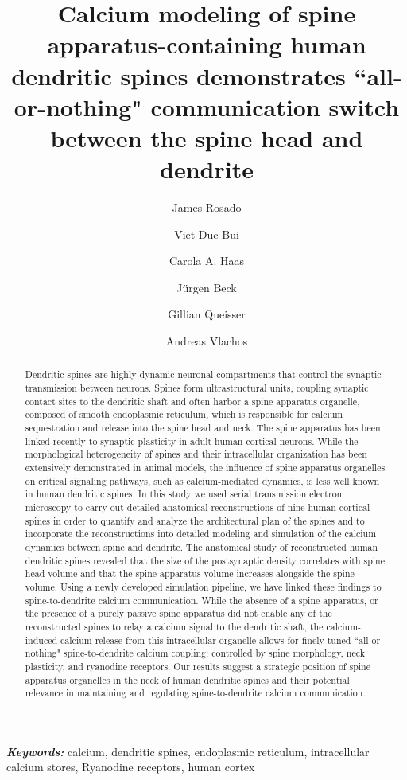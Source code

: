 \documentclass[12pt]{article}
\title{\vspace{-3em}\titlefont Calcium modeling of spine apparatus-containing human dendritic spines demonstrates ``all-or-nothing" communication switch between the spine head and dendrite}
\author[1,$\ast$]{\authorfont James Rosado}
\author[2,$\ast$]{\authorfont Viet Duc Bui}
\author[3,4,5,6]{\authorfont Carola A. Haas}
\author[3,6]{\authorfont J\"urgen Beck}
\author[1,$\$$,\S]{\authorfont Gillian Queisser}
\author[2,4,5,6,$\$$,\S]{\authorfont Andreas Vlachos}
\affil[1]{\authorfont Department of Mathematics, Temple University, Philadelphia, USA}
\affil[2]{\authorfont Department of Neuroanatomy, Institute of Anatomy and Cell Biology, Faculty of Medicine, University of Freiburg, Freiburg, Germany}
\affil[3]{\authorfont Department of Neurosurgery, Medical Center-University of Freiburg, Faculty of Medicine, University of Freiburg, Freiburg, Germany}
\affil[4]{\authorfont Bernstein Center Freiburg, University of Freiburg, Freiburg, Germany}
\affil[5]{\authorfont Center Brain Links Brain Tools, University of Freiburg, Freiburg, Germany}
\affil[6]{\authorfont Center for Basics in NeuroModulation (NeuroModulBasics), Faculty of Medicine, University of Freiburg, Freiburg, Germany}
\affil[$\ast$]{\authorfont These authors contributed equally to this work}
\affil[$\$$]{\authorfont Joint senior authors}
\affil[$\S$]{\authorfont Correspondence to gillian.queisser@temple.edu and andreas.vlachos@anat.uni-freiburg.de}
\date{}
\providecommand{\keywords}[1]{\textbf{\textit{Keywords:}} #1}
\begin{document}
\maketitle

\vspace{-3em}
\clearpage
\begin{abstract}
    Dendritic spines are highly dynamic neuronal compartments that control the synaptic  transmission between neurons. Spines form ultrastructural units, coupling synaptic contact sites to the dendritic shaft and often harbor a spine apparatus organelle, composed of smooth endoplasmic reticulum, which is responsible for calcium sequestration and release into the spine head and neck. The spine apparatus has been linked recently to synaptic plasticity in adult human cortical neurons. While the morphological heterogeneity of spines and their intracellular organization has been extensively demonstrated in animal models, the influence of spine apparatus organelles on critical signaling pathways, such as calcium-mediated dynamics, is less well known in human dendritic spines. In this study we used serial transmission electron microscopy to carry out detailed anatomical reconstructions of nine human cortical spines in order to quantify and analyze the architectural plan of the spines and to incorporate the reconstructions into detailed modeling and simulation of the calcium dynamics between spine and dendrite. The anatomical study of reconstructed human dendritic spines revealed that the size of the postsynaptic density correlates with spine head volume and that the spine apparatus volume increases alongside the spine volume. Using a newly developed simulation pipeline, we have linked these findings to spine-to-dendrite calcium communication. While the absence of a spine apparatus, or the presence of a purely passive spine apparatus did not enable any of the reconstructed spines to relay a calcium signal to the dendritic shaft, the calcium-induced calcium release from this intracellular organelle allows for finely tuned ``all-or-nothing" spine-to-dendrite calcium coupling; controlled by spine morphology, neck plasticity, and ryanodine receptors. Our results suggest a  strategic position of spine apparatus organelles in the neck of human dendritic spines and their potential relevance in maintaining and regulating spine-to-dendrite calcium communication.
\end{abstract}
\keywords{calcium, dendritic spines, endoplasmic reticulum, intracellular calcium stores, Ryanodine receptors, human cortex}
\clearpage
\end{document}
